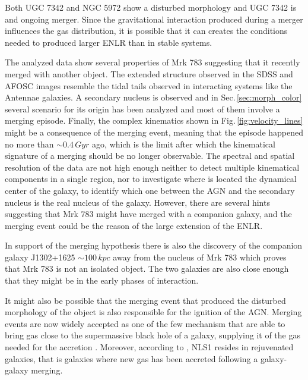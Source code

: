 \documentclass[../main.tex]{subfiles}
\begin{document}
Both UGC 7342 and NGC 5972 show a disturbed morphology and UGC 7342 is and ongoing merger.
Since the gravitational interaction produced during a merger influences the gas distribution, it is possible that it can creates the conditions needed to produced larger ENLR than in stable systems.

The analyzed data show several properties of Mrk 783 suggesting that it recently merged with another object.
The extended structure observed in the SDSS and AFOSC images resemble the tidal tails observed in interacting systems like the Antennae galaxies.
A secondary nucleus is observed and in Sec.\,\ref{sec:morph_color} several scenario for its origin has been analyzed and most of them involve a merging episode.
Finally, the complex kinematics shown in Fig.\,\ref{fig:velocity_lines} might be a consequence of the merging event, meaning that the episode happened no more than $\sim 0.4\,\si{Gyr}$ ago, which is the limit after which the kinematical signature of a merging should be no longer observable.
The spectral and spatial resolution of the data are not high enough neither to detect multiple kinematical components in a single region, nor to investigate where is located the dynamical center of the galaxy, to identify which one between the AGN and the secondary nucleus is the real nucleus of the galaxy.
However, there are several hints suggesting that Mrk 783 might have merged with a companion galaxy, and the merging event could be the reason of the large extension of the ENLR.

In support of the merging hypothesis there is also the discovery of the companion galaxy J1302+1625 $\sim100\,\si{kpc}$ away from the nucleus of Mrk 783 which proves that Mrk 783 is not an isolated object.
The two galaxies are also close enough that they might be in the early phases of interaction.

It might also be possible that the merging event that produced the disturbed morphology of the object is also responsible for the ignition of the AGN.
Merging events are now widely accepted as one of the few mechanism that are able to bring gas close to the supermassive black hole of a galaxy, supplying it of the gas needed for the accretion \citep{Sanders88,Hong15}.
Moreover, according to \citet{Mathur00}, NLS1 resides in rejuvenated galaxies, that is galaxies where new gas has been accreted following a galaxy-galaxy merging.
\end{document}
